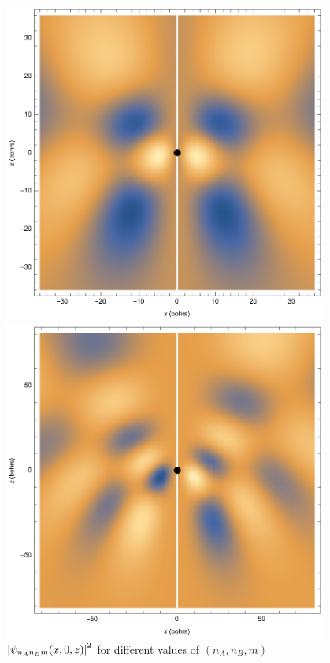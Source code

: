 \documentclass{beamer}
\theoremstyle{definition}
\begin{document}
\begin{frame}
\begin{figure}[!htb]
\begin{minipage}{0.24\textwidth}
\caption*{$(2,0,0)$}
\end{minipage}
\begin{minipage}{0.24\textwidth}
\includegraphics[width=0.95\textwidth]{figures/212.eps}
\caption*{$(2,1,2)$}
\end{minipage}
\begin{minipage}{0.24\textwidth}
\includegraphics[width=0.95\textwidth]{figures/413.eps}
\caption*{$(4,1,3)$}
\end{minipage}
\caption{$\abs{\psi_{n_An_Bm}(x,0,z)}^2$ for different values of  $(n_A, n_B, m)$ \cite{blinder2011}}
\end{figure}

\end{frame}
\end{document}
